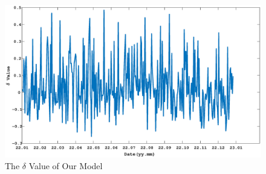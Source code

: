 \documentclass[12pt]{article}  %
\begin{document}
\begin{figure}[htbp]
\centering
\includegraphics[width=\textwidth]{img/delta.eps}
\caption{The $\delta$ Value of Our Model}\label{delta}
\end{figure}











\end{document}
